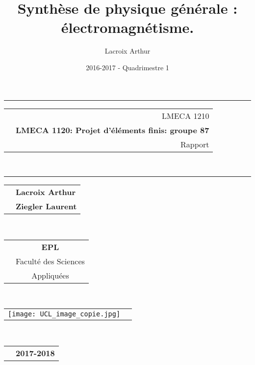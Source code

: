 \documentclass{article}
\title{\Huge{Synthèse de physique générale : électromagnétisme.}}
\author{Lacroix Arthur}
\date{2016-2017 - Quadrimestre 1}
\theoremstyle{definition}
\newlength{\deca}
\newcommand{\code}{LMECA 1210}
\newcommand{\cours}{LMECA 1120: Projet d'éléments finis: groupe 87}
\newcommand{\stitre}{Rapport}
\newcommand{\dateb}{2017-2018}
\begin{document}
\begin{titlepage}
	\centering
	{\rule{15.8cm}{1mm}}\vspace{3mm}
	\begin{tabular}{p{\deca} r}
		& \code \vspace{1mm}\\
		& {\huge {\bf \cours}} \vspace{3mm}\\
		& {\huge \stitre}
	\end{tabular}\\
	\vspace{1mm}
	{\rule{15.8cm}{1mm}}
	
	\vspace{5cm}
	
	\begin{tabular}{p{8cm} l}
	
		& {\huge \bf Lacroix Arthur} \\
		& {\huge \bf Ziegler Laurent} \\
	
		
		
	\end{tabular}\\
	\vspace{5.5cm}
	
	\begin{minipage}[h]{0.5\textwidth}
		\begin{flushright}
			\begin{tabular}{p{0cm} c}
				& {\Huge {\bf EPL}} \\
				& {\huge Faculté des Sciences}\\
				 &{\huge Appliquées}
			\end{tabular}\\
		\end{flushright}
	\end{minipage}
	\begin{minipage}[h]{0.3\textwidth}
		\begin{flushright}
			\begin{tabular}{p{10cm} c}
\texttt{[image: UCL\_image\_copie.jpg]} 
			\end{tabular}\\
		\end{flushright}
	\end{minipage}
	
	\vspace{10mm}
	
	\begin{tabular}{p{7cm} c}
		& {\huge \bf \dateb} \\
	\end{tabular}\\
	
\end{titlepage}
\end{document}
